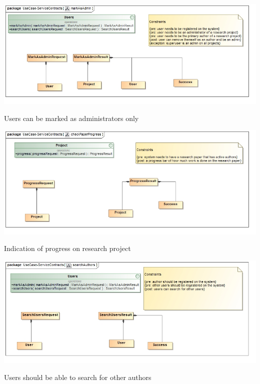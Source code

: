 \documentclass[a4paper,12pt]{report}
\begin{document}
\newpage

\begin{flushleft}
	\includegraphics[scale=0.5]{./images/class__markAsAdmin.jpg}
	\begin{center}
		Users can be marked as administrators only
	\end{center}
\end{flushleft}

\begin{flushleft}
	\includegraphics[scale=0.5]{./images/class__checkPaperProgress.jpg}
	\begin{center}
		Indication of progress on research project
	\end{center}
\end{flushleft}

\newpage

\begin{flushleft}
	\includegraphics[scale=0.5]{./images/class__searchAuthors.jpg}
	\begin{center}
		Users should be able to search for other authors
	\end{center}
\end{flushleft}
\end{document}
